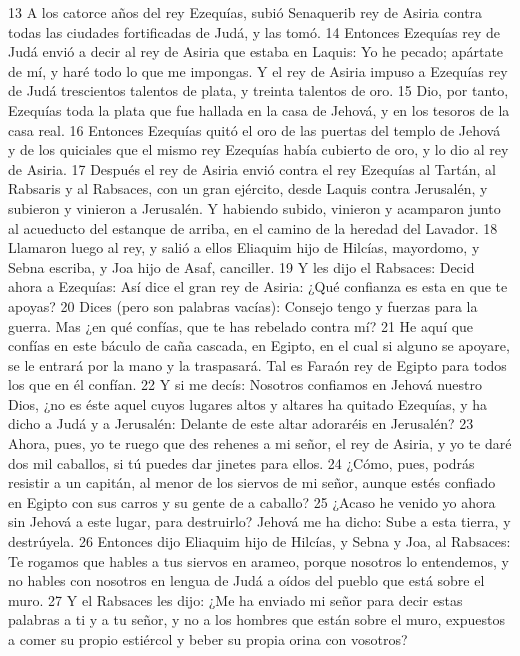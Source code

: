 13 A los catorce años del rey Ezequías, subió Senaquerib rey de Asiria contra todas las ciudades fortificadas de Judá, y las tomó.
14 Entonces Ezequías rey de Judá envió a decir al rey de Asiria que estaba en Laquis: Yo he pecado; apártate de mí, y haré todo lo que me impongas. Y el rey de Asiria impuso a Ezequías rey de Judá trescientos talentos de plata,  y treinta talentos de oro.
15 Dio, por tanto, Ezequías toda la plata que fue hallada en la casa de Jehová, y en los tesoros de la casa real.
16 Entonces Ezequías quitó el oro de las puertas del templo de Jehová y de los quiciales que el mismo rey Ezequías había cubierto de oro, y lo dio al rey de Asiria.
17 Después el rey de Asiria envió contra el rey Ezequías al Tartán, al Rabsaris y al Rabsaces, con un gran ejército, desde Laquis contra Jerusalén, y subieron y vinieron a Jerusalén. Y habiendo subido, vinieron y acamparon junto al acueducto del estanque de arriba, en el camino de la heredad del Lavador.
18 Llamaron luego al rey, y salió a ellos Eliaquim hijo de Hilcías, mayordomo, y Sebna escriba, y Joa hijo de Asaf, canciller.
19 Y les dijo el Rabsaces: Decid ahora a Ezequías: Así dice el gran rey de Asiria: ¿Qué confianza es esta en que te apoyas?
20 Dices (pero son palabras vacías): Consejo tengo y fuerzas para la guerra. Mas ¿en qué confías, que te has rebelado contra mí?
21 He aquí que confías en este báculo de caña cascada, en Egipto, en el cual si alguno se apoyare, se le entrará por la mano y la traspasará. Tal es Faraón rey de Egipto para todos los que en él confían.
22 Y si me decís: Nosotros confiamos en Jehová nuestro Dios, ¿no es éste aquel cuyos lugares altos y altares ha quitado Ezequías, y ha dicho a Judá y a Jerusalén: Delante de este altar adoraréis en Jerusalén?
23 Ahora, pues, yo te ruego que des rehenes a mi señor, el rey de Asiria, y yo te daré dos mil caballos, si tú puedes dar jinetes para ellos.
24 ¿Cómo, pues, podrás resistir a un capitán, al menor de los siervos de mi señor, aunque estés confiado en Egipto con sus carros y su gente de a caballo?
25 ¿Acaso he venido yo ahora sin Jehová a este lugar, para destruirlo? Jehová me ha dicho: Sube a esta tierra, y destrúyela.
26 Entonces dijo Eliaquim hijo de Hilcías, y Sebna y Joa, al Rabsaces: Te rogamos que hables a tus siervos en arameo, porque nosotros lo entendemos, y no hables con nosotros en lengua de Judá a oídos del pueblo que está sobre el muro.
27 Y el Rabsaces les dijo: ¿Me ha enviado mi señor para decir estas palabras a ti y a tu señor, y no a los hombres que están sobre el muro, expuestos a comer su propio estiércol y beber su propia orina con vosotros?
